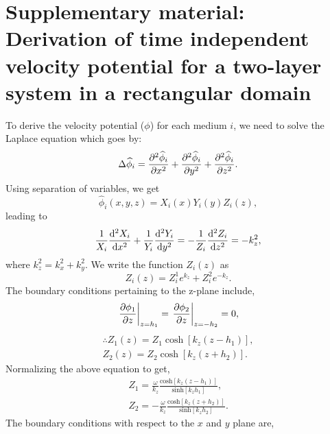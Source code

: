 \documentclass[aps,prfluids,reprint,superscriptaddress]{revtex4-2}
\newcommand{\noi}{\noindent}
\begin{document}
\section{Supplementary material: Derivation of time independent velocity potential for a two-layer system in a rectangular domain}
\label{supplA}

\noi To derive the velocity potential ($\phi$) for each medium $i$, we need to solve the Laplace equation which goes by:
\begin{equation}
	\Delta \widehat\phi_i = \pdv[2]{\widehat\phi_i}{x} + \pdv[2]{\widehat\phi_i}{y} + \pdv[2]{\widehat\phi_i}{z}.
\end{equation}
Using separation of variables, we get
\begin{equation}
	\widehat\phi_i (x, y, z) = X_i(x) Y_i(y) Z_i(z),
	\label{eq:vel_pot_separation-ansatz}
\end{equation}
leading to
\begin{equation}
	\dfrac{1}{X_i}\dv[2]{X_i}{x} + \dfrac{1}{Y_i}\dv[2]{Y_i}{y} = - \dfrac{1}{Z_i}\dv[2]{Z_i}{z} = -k_z^2 ,
\end{equation}
where $k_z^2 = k_x^2 + k_y^2$. We write the function $Z_i(z)$ as
\begin{equation}
	Z_i(z) = Z^1_i e^{k_z} + Z^2_i e^{-k_z}.
\end{equation}
The boundary conditions pertaining to the z-plane include,
\begin{equation}
	\left.\pdv{\phi_1}{z}\right\vert_{z=h_1} = \left.\pdv{\phi_2}{z}\right\vert_{z=-h_2} = 0 ,
\end{equation}
\begin{equation}
	\begin{split}
		\therefore
		Z_1(z) = Z_1\cosh{[k_z(z-h_1)]},
		\\
		Z_2(z) = Z_2\cosh{[k_z(z+h_2)]}.
	\end{split}
\end{equation}
Normalizing the above equation to get,
\begin{equation}
	\begin{split}
		Z_1=\frac{\omega}{k_z}\frac{\text{cosh}[k_z(z-h_1)]}{\text{sinh}[k_zh_1]},
		\\
		Z_2=-\frac{\omega}{k_z}\frac{\text{cosh}[k_z(z+h_2)]}{\text{sinh}[k_zh_2]}.
	\end{split}
	\label{eq:vel_pot_Z_soln}
\end{equation}
The boundary conditions with respect to the $x$ and $y$ plane are,
\end{document}
